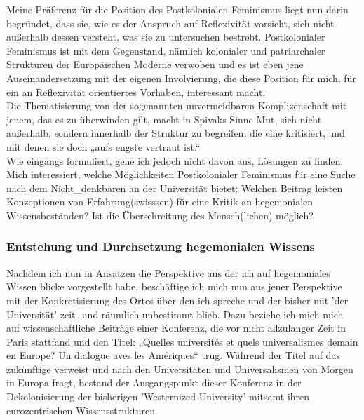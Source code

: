 \noindent Meine Präferenz für die Position des Postkolonialen Feminismus liegt nun darin
begründet, dass sie, wie es der Anspruch auf Reflexivität vorsieht, sich nicht
außerhalb dessen versteht, was sie zu untersuchen bestrebt. Postkolonialer
Feminismus ist mit dem Gegenstand, nämlich kolonialer und patriarchaler
Strukturen der Europäischen Moderne verwoben und es ist eben jene
Auseinandersetzung mit der eigenen Involvierung, die diese Position für mich,
für ein an Reflexivität orientiertes Vorhaben, interessant macht. \\
Die
Thematisierung von der sogenannten unvermeidbaren Komplizenschaft mit jenem,
das es zu überwinden gilt, macht in Spivaks Sinne Mut, sich nicht
außerhalb, sondern innerhalb der Struktur zu begreifen, die eine kritisiert,
und mit denen sie doch „aufs engste vertraut ist.“ \footnotemark 
{}\\

\noindent Wie eingangs formuliert, gehe ich jedoch nicht davon aus, Lösungen zu finden.
Mich interessiert, welche Möglichkeiten Postkolonialer Feminismus für eine
Suche nach dem Nicht\_denkbaren an der Universität bietet: Welchen Beitrag
leisten Konzeptionen von Erfahrung(swisssen) für eine Kritik an hegemonialen
Wissensbeständen? Ist die Überschreitung des Mensch(lichen) möglich?

\subsubsection{Entstehung und Durchsetzung hegemonialen Wissens}

Nachdem ich nun in Ansätzen die Perspektive aus der ich auf hegemoniales Wissen
blicke vorgestellt habe, beschäftige ich mich nun aus jener Perspektive mit der
Konkretisierung des Ortes über den ich spreche und der bisher mit 'der
Universität' zeit- und räumlich unbestimmt blieb. Dazu beziehe ich mich mich
auf wissenschaftliche Beiträge einer Konferenz, die vor nicht allzulanger Zeit
in Paris stattfand und den Titel: „Quelles universités et quels
universalismes demain en Europe? Un dialogue aves les Amériques“ \footnotemark {} trug. Während der Titel auf das zukünftige
verweist und nach den Universitäten und Universalismen von Morgen in Europa
fragt, bestand der Ausgangspunkt dieser Konferenz in der Dekolonisierung der
bisherigen 'Westernized University' mitsamt ihren eurozentrischen
Wissensstrukturen.\\ 

